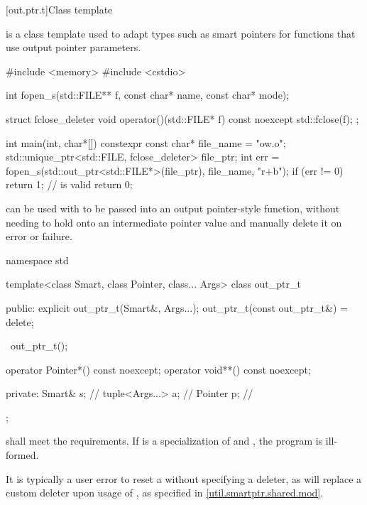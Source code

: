 [out.ptr.t]{Class template }

\pnum
{} is a class template used to adapt types
such as smart pointers
for functions that use output pointer parameters.

\pnum
\begin{example}
\begin{codeblock}
#include <memory>
#include <cstdio>

int fopen_s(std::FILE** f, const char* name, const char* mode);

struct fclose_deleter {
  void operator()(std::FILE* f) const noexcept {
    std::fclose(f);
  }
};

int main(int, char*[]) {
  constexpr const char* file_name = "ow.o";
  std::unique_ptr<std::FILE, fclose_deleter> file_ptr;
  int err = fopen_s(std::out_ptr<std::FILE*>(file_ptr), file_name, "r+b");
  if (err != 0)
    return 1;
  //  is valid
  return 0;
}
\end{codeblock}
 can be used with 
to be passed into an output pointer-style function,
without needing to hold onto an intermediate pointer value and
manually delete it on error or failure.
\end{example}

%
\begin{codeblock}
namespace std {
  template<class Smart, class Pointer, class... Args>
  class out_ptr_t {
  public:
    explicit out_ptr_t(Smart&, Args...);
    out_ptr_t(const out_ptr_t&) = delete;

    ~out_ptr_t();

    operator Pointer*() const noexcept;
    operator void**() const noexcept;

  private:
    Smart& s;                   // \expos
    tuple<Args...> a;           // \expos
    Pointer p;                  // \expos
  };
}
\end{codeblock}

\pnum
{} shall meet the  requirements.
If  is a specialization of  and
,
the program is ill-formed.
\begin{note}
It is typically a user error to reset a 
without specifying a deleter,
as  will replace a custom deleter upon usage of ,
as specified in \ref{util.smartptr.shared.mod}.
\end{note}

